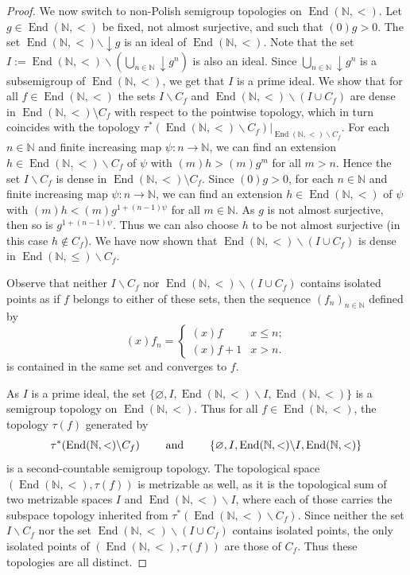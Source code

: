 \documentclass[11pt]{amsart}
\theoremstyle{definition}
\newcommand{\N}{\mathbb N}
\newcommand{\End}{\operatorname{End}(\mathbb N, <)}
\newcommand{\Endd}{\operatorname{End}(\mathbb N, \leq)}
\begin{document}
\begin{proof}
    We now switch to non-Polish semigroup topologies on $\End$. Let \(g\in  \End\) be fixed, not almost surjective, and such that \((0)g> 0\).
    The set $\End\backslash {\downarrow}g$ is an ideal of \(\End\). Note that the set $I:=\End\backslash (\bigcup_{n\in \N}{\downarrow}g^n)$ is also an ideal. Since $\bigcup_{n\in \N}{\downarrow}g^n$ is a subsemigroup of $\End$, we get that \(I\) is a prime ideal. 
    We show that for all \(f\in \End\) the sets \(I\backslash C_f\) and \(\End\backslash (I\cup C_f)\) are dense in \(\End \setminus C_f\) with respect to the pointwise topology, which in turn coincides with the topology $\tau^*(\End\backslash C_f)|_{\End\backslash C_f}$.
    For each $n\in\N$ and finite increasing map $\psi: n\rightarrow \N$, we can find an extension \(h\in \End\backslash C_f\) of \(\psi\) with \((m)h> (m)g^m\) for all \(m>n \). Hence the set $I\backslash C_f$ is dense in \(\End \setminus C_f\). 
    Since \((0)g>0\), for each $n\in\N$ and finite increasing map $\psi: n\rightarrow \N$, we can find an extension \(h\in \End\) of \(\psi\) with \((m)h< (m)g^{1+(n-1)\psi}\) for all \(m\in \N \). As \(g\) is not almost surjective, then so is $g^{1+(n-1)\psi}$.  Thus we can also choose \(h\) to be not almost surjective (in this case \(h\notin C_f\)). 
    We have now shown that \(\End \backslash (I\cup C_f)\) is dense in \(\Endd\backslash C_f\). 
    
    Observe that neither \(I\backslash C_f\) nor \(\End \backslash (I\cup C_f)\) contains isolated points as if \(f\) belongs to either of these sets, then the sequence \((f_n)_{n\in \N}\) defined by
    \[(x)f_n=\begin{cases}
        (x)f & x\leq n;\\
        (x)f+1 & x>n.
    \end{cases}\]
    is contained in the same set and converges to \(f\).
    
    As \(I\) is a prime ideal, the set \(\{\varnothing, I, \End \backslash I, \End\}\) is a semigroup topology on \(\End\). Thus for all \(f\in \End\), the topology \(\tau(f)\) generated by $$\tau^*(\End\backslash C_f)\qquad \hbox{ and } \qquad\{\varnothing, I, \End \backslash I, \End\}$$ is a second-countable semigroup topology.
    The topological space \((\End,\tau(f))\) is metrizable as well, as it is the topological sum of two metrizable spaces $I$ and $\End \backslash I$, where each of those carries the subspace topology inherited from \(\tau^*(\End\backslash C_f)\). Since neither the set \(I\backslash C_f\) nor the set \(\End \backslash (I\cup C_f)\) contains isolated points, the only isolated points of \((\End,\tau(f))\) are those of \(C_f\). Thus these topologies are all distinct.
    

\end{proof}
\end{document}
